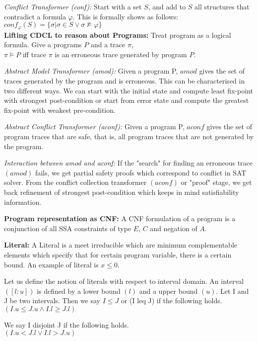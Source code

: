 \documentclass{article}
\begin{document}
\textit{Conflict Transformer (conf):} Start with a set $S$, and add to $S$ all structures 
that contradict a formula $\varphi$. This is formally shows as follows:\\
$conf_{\varphi}(S) = \{\sigma | \sigma \in S \vee \sigma \not\models \varphi\}$
\\
 
\textbf{Lifting CDCL to reason about Programs:}
Treat program as a logical formula. Give a programs $P$ and a trace $\pi$, \\
$\pi \models P$ iff trace $\pi$ is an erroneous trace generated by program
$P$.

\textit{Abstract Model Transformer (amod):} Given a program P, $amod$ gives the 
set of traces generated by the program and is erroneous. This can be
characterised in two different ways. We can start with the initial state and
compute least fix-point with strongest post-condition or start from error state 
and compute the greatest fix-point with weakest pre-condition. 

\textit{Abstract Conflict Transformer (aconf):} Given a program P, $aconf$ gives the 
set of program traces that are safe, that is, all program traces that are not
generated by the program. 

\textit{Interaction between amod and aconf:} If the "search" for finding an 
erroneous trace $(amod)$ fails, we get partial safety proofs which correspond 
to conflict in SAT solver. From the conflict collection transformer $(aconf)$ or 
"proof" stage, we get back refinement of strongest post-condition which keeps in 
mind satisfiability information. 

\textbf{Program representation as CNF:}
A CNF formulation of a program is a conjunction of all 
SSA constraints of type $E$, $C$ and negation of $A$.

\textbf{Literal:} A Literal is a meet irreducible which are minimum complementable
elements which specify that for certain program variable, there is a certain
bound. An example of literal is $x \leq 0$.

Let us define the notion of literals with respect to interval domain. 
An interval $([l:u])$ is defined by a lower bound $(l)$ and a upper bound $(u)$.
Let I and J be two intervals. Then we say $I \leq J$ or (I leq J) if the following
holds. \\
$(I.u \leq J.u \wedge I.l \geq J.l)$

We say I disjoint J if the following holds.\\
$(I.u < J.l \vee  I.l > J.u)$
\end{document}
